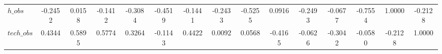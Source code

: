 \begin{center}
\begin{longtable}{lcccccccccccccc}
$h\_obs         $	 & 	          -0.2452	 & 	           0.0158	 & 	          -0.1412	 & 	          -0.3084	 & 	          -0.4519	 & 	          -0.1441	 & 	          -0.2433	 & 	          -0.5255	 & 	           0.0916	 & 	          -0.2493	 & 	          -0.0677	 & 	          -0.7554	 & 	           1.0000	 & 	          -0.2128 \\ 
$tech\_obs      $	 & 	           0.4344	 & 	           0.5895	 & 	           0.5774	 & 	           0.3264	 & 	          -0.1143	 & 	           0.4422	 & 	           0.0092	 & 	           0.0568	 & 	          -0.4165	 & 	          -0.0626	 & 	          -0.3042	 & 	          -0.0580	 & 	          -0.2128	 & 	           1.0000 \\ 
\end{longtable}
 \end{center}
